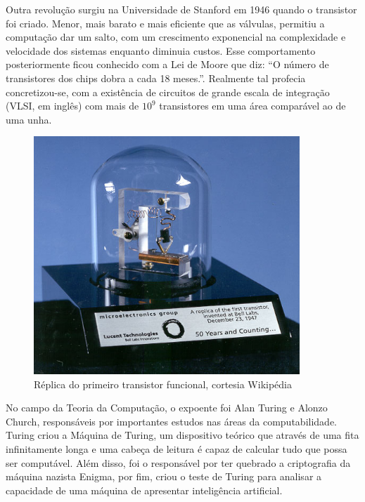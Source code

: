 \documentclass[brazil,times]{abnt}
\begin{document}
Outra revolução surgiu na Universidade de Stanford em 1946 quando o transistor
foi criado. Menor, mais barato e mais eficiente que as válvulas, permitiu a
computação dar um salto, com um crescimento exponencial na complexidade e
velocidade dos sistemas enquanto diminuia custos. Esse comportamento
posteriormente ficou conhecido com a Lei de Moore que diz: ``O número de
transistores dos chips dobra a cada 18 meses.''. Realmente tal profecia
concretizou-se, com a existência de circuitos de grande
escala de integração (VLSI, em inglês) com mais de $10^9$ transistores em uma
área comparável ao de uma unha.

\begin{figure}[htp]
\begin{center}
  \includegraphics[width=100mm]{imagens/Replica-of-first-transistor.jpg}
  \caption[Réplica do primeiro transistor funcional, cortesia Wikipédia]{Réplica
  do primeiro transistor funcional, cortesia Wikipédia}
  \label{fig:transistor}
\end{center}
\end{figure}

No campo da Teoria da Computação, o expoente foi Alan Turing e Alonzo Church,
responsáveis por importantes estudos nas áreas da computabilidade. Turing criou
a Máquina de Turing, um dispositivo teórico que através de uma fita
infinitamente longa e uma cabeça de leitura é capaz de calcular tudo que possa
ser computável. Além disso, foi o responsável por ter quebrado a criptografia da
máquina nazista Enigma, por fim, criou o teste de Turing para analisar a
capacidade de uma máquina de apresentar inteligência artificial.
\end{document}

